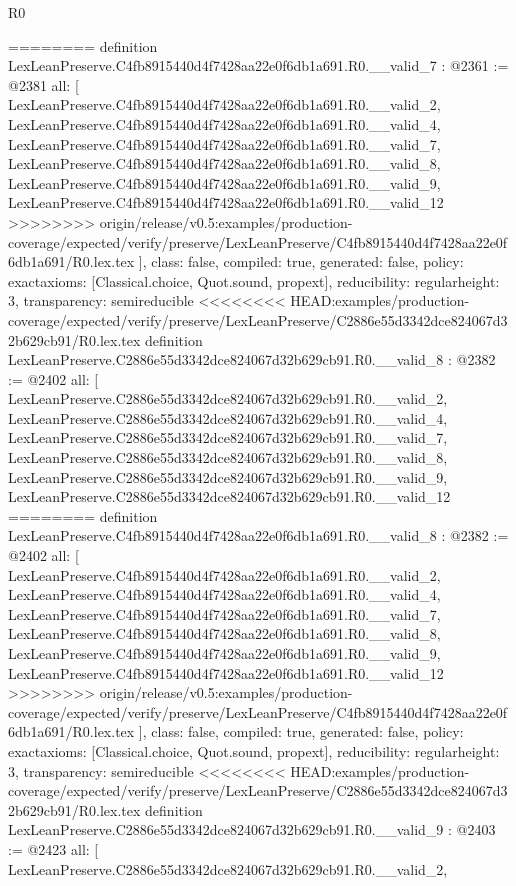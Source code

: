 \begin{lexlean}{R0}
\begin{coremodule}
{{{{{{{{{{{{{{{{{{{{{{{{{{{{{{{{{{{{{{{{{{{{{{========
definition LexLeanPreserve.C4fb8915440d4f7428aa22e0f6db1a691.R0.__valid_7 : @2361 := @2381 {
  all: [
    LexLeanPreserve.C4fb8915440d4f7428aa22e0f6db1a691.R0.__valid_2,
    LexLeanPreserve.C4fb8915440d4f7428aa22e0f6db1a691.R0.__valid_4,
    LexLeanPreserve.C4fb8915440d4f7428aa22e0f6db1a691.R0.__valid_7,
    LexLeanPreserve.C4fb8915440d4f7428aa22e0f6db1a691.R0.__valid_8,
    LexLeanPreserve.C4fb8915440d4f7428aa22e0f6db1a691.R0.__valid_9,
    LexLeanPreserve.C4fb8915440d4f7428aa22e0f6db1a691.R0.__valid_12
>>>>>>>> origin/release/v0.5:examples/production-coverage/expected/verify/preserve/LexLeanPreserve/C4fb8915440d4f7428aa22e0f6db1a691/R0.lex.tex
  ],
  class: false,
  compiled: true,
  generated: false,
  policy: exact{axioms: [Classical.choice, Quot.sound, propext]},
  reducibility: regular{height: 3},
  transparency: semireducible
}
<<<<<<<< HEAD:examples/production-coverage/expected/verify/preserve/LexLeanPreserve/C2886e55d3342dce824067d32b629cb91/R0.lex.tex
definition LexLeanPreserve.C2886e55d3342dce824067d32b629cb91.R0.__valid_8 : @2382 := @2402 {
  all: [
    LexLeanPreserve.C2886e55d3342dce824067d32b629cb91.R0.__valid_2,
    LexLeanPreserve.C2886e55d3342dce824067d32b629cb91.R0.__valid_4,
    LexLeanPreserve.C2886e55d3342dce824067d32b629cb91.R0.__valid_7,
    LexLeanPreserve.C2886e55d3342dce824067d32b629cb91.R0.__valid_8,
    LexLeanPreserve.C2886e55d3342dce824067d32b629cb91.R0.__valid_9,
    LexLeanPreserve.C2886e55d3342dce824067d32b629cb91.R0.__valid_12
========
definition LexLeanPreserve.C4fb8915440d4f7428aa22e0f6db1a691.R0.__valid_8 : @2382 := @2402 {
  all: [
    LexLeanPreserve.C4fb8915440d4f7428aa22e0f6db1a691.R0.__valid_2,
    LexLeanPreserve.C4fb8915440d4f7428aa22e0f6db1a691.R0.__valid_4,
    LexLeanPreserve.C4fb8915440d4f7428aa22e0f6db1a691.R0.__valid_7,
    LexLeanPreserve.C4fb8915440d4f7428aa22e0f6db1a691.R0.__valid_8,
    LexLeanPreserve.C4fb8915440d4f7428aa22e0f6db1a691.R0.__valid_9,
    LexLeanPreserve.C4fb8915440d4f7428aa22e0f6db1a691.R0.__valid_12
>>>>>>>> origin/release/v0.5:examples/production-coverage/expected/verify/preserve/LexLeanPreserve/C4fb8915440d4f7428aa22e0f6db1a691/R0.lex.tex
  ],
  class: false,
  compiled: true,
  generated: false,
  policy: exact{axioms: [Classical.choice, Quot.sound, propext]},
  reducibility: regular{height: 3},
  transparency: semireducible
}
<<<<<<<< HEAD:examples/production-coverage/expected/verify/preserve/LexLeanPreserve/C2886e55d3342dce824067d32b629cb91/R0.lex.tex
definition LexLeanPreserve.C2886e55d3342dce824067d32b629cb91.R0.__valid_9 : @2403 := @2423 {
  all: [
    LexLeanPreserve.C2886e55d3342dce824067d32b629cb91.R0.__valid_2,
}}}}}}}}}}}}}}}}}}}}}}}}}}}}}}}}}}}}}}}}}}}}}}}}
\end{coremodule}
\end{lexlean}
